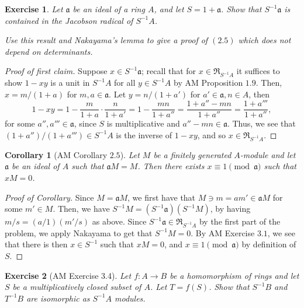 \documentclass[12pt,letterpaper]{article}
\newtheorem{problem}{Exercise}[section]
\newtheorem{corollary}{Corollary}
\theoremstyle{definition}
\theoremstyle{remark}
\numberwithin{figure}{problem}
\numberwithin{equation}{section}
\begin{document}
\begin{problem}
  Let $\mathfrak{a}$ be an ideal of a ring $A$, and let $S = 1 + \mathfrak{a}$. Show that $S^{-1}\mathfrak{a}$ is contained in the Jacobson radical of $S^{-1}A$.
  \par Use this result and Nakayama's lemma to give a proof of $(2.5)$ which does not depend on determinants.
\end{problem}
\begin{proof}[Proof of first claim]
  Suppose $x \in S^{-1}\mathfrak{a}$; recall that for $x \in \mathfrak{R}_{S^{-1}A}$ it suffices to show $1-xy$ is a unit in $S^{-1}A$ for all $y \in S^{-1}A$ by AM Proposition $1.9$. Then, $x = m/(1+a)$ for $m,a \in \mathfrak{a}$. Let $y = n/(1+a')$ for $a' \in \mathfrak{a},n \in A$, then
  \begin{equation*}
    1 - xy = 1 - \frac{m}{1+a} \cdot \frac{n}{1+a'} = 1 - \frac{mn}{1+a''} = \frac{1 + a''-mn}{1+a''} = \frac{1 + a'''}{1+a''},
  \end{equation*}
  for some $a'',a''' \in \mathfrak{a}$, since $S$ is multiplicative and $a''-mn \in \mathfrak{a}$. Thus, we see that $(1+a'')/(1+a''') \in S^{-1}A$ is the inverse of $1-xy$, and so $x \in \mathfrak{R}_{S^{-1}A}$.
\end{proof}
\begin{corollary}[AM Corollary $2.5$]
  Let $M$ be a finitely generated $A$-module and let $\mathfrak{a}$ be an ideal of $A$ such that $\mathfrak{a}M = M$. Then there exists $x \equiv 1\pmod{\mathfrak{a}}$ such that $xM = 0$.
\end{corollary}
\begin{proof}[Proof of Corollary]
  Since $M = \mathfrak{a}M$, we first have that $M \ni m = am' \in \mathfrak{a}M$ for some $m' \in M$. Then, we have $S^{-1}M = (S^{-1}\mathfrak{a})(S^{-1}M)$, by having $m/s = (a/1)(m'/s)$ as above. Since $S^{-1}\mathfrak{a} \in \mathfrak{R}_{S^{-1}A}$ by the first part of the problem, we apply Nakayama to get that $S^{-1}M = 0$. By AM Exercise $3.1$, we see that there is then $x \in S^{-1}$ such that $xM = 0$, and $x \equiv 1 \pmod{\mathfrak{a}}$ by definition of $S$.
\end{proof}

\begin{problem}[AM Exercise 3.4] 
Let $f: A \to B$ be a homomorphism of rings and let $S$ be a multiplicatively closed subset of $A$. Let $T= f(S)$. Show that $S^{-1}B$ and $T^{-1}B$ are isomorphic as $S^{-1}A$ modules. 
\end{problem}
\end{document}
